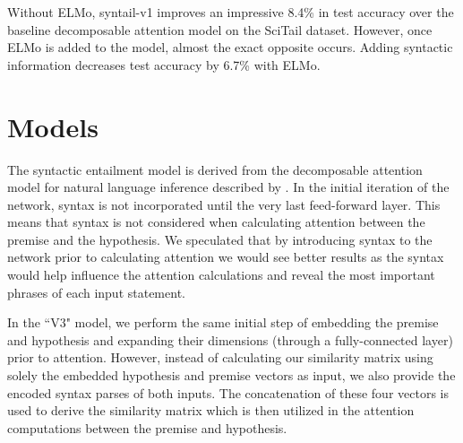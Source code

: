 \documentclass[11pt,a4paper]{article}
\begin{document}
Without ELMo, syntail-v1 improves an impressive 8.4\% in test accuracy over the
baseline decomposable attention model on the SciTail dataset. However, once
ELMo is added to the model, almost the exact opposite occurs. Adding syntactic
information decreases test accuracy by 6.7\% with ELMo.

\begin{table}[h]
  \caption{Syntail-v1 and DA model accuracies on the SciTail dataset.}
\label{table:v1-accuracies}
\end{table}

\section{Models}

The syntactic entailment model is derived from the decomposable attention model for natural language inference described by \citet{Parikh2016-em}. In the initial iteration of the network, syntax is not incorporated until the very last feed-forward layer. This means that syntax is not considered when calculating attention between the premise and the hypothesis. We speculated that by introducing syntax to the network prior to calculating attention we would see better results as the syntax would help influence the attention calculations and reveal the most important phrases of each input statement.

In the ``V3" model, we perform the same initial step of embedding the premise and hypothesis and expanding their dimensions (through a fully-connected layer) prior to attention. However, instead of calculating our similarity matrix using solely the embedded hypothesis and premise vectors as input, we also provide the encoded syntax parses of both inputs. The concatenation of these four vectors is used to derive the similarity matrix which is then utilized in the attention computations between the premise and hypothesis.
\end{document}
